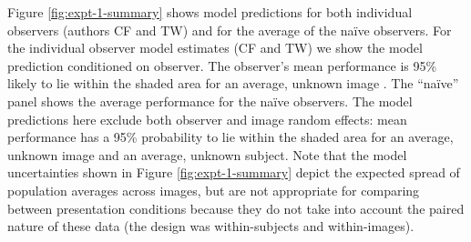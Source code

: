 \documentclass[doc, 11pt,a4paper,natbib]{apa6}\usepackage[]{graphicx}\usepackage[]{color}
\begin{document}
Figure \ref{fig:expt-1-summary} shows model predictions for both individual observers (authors CF and TW) and for the average of the na\"{i}ve observers.
For the individual observer model estimates (CF and TW) we show the model prediction conditioned on observer. 
The observer's mean performance is 95\% likely to lie within the shaded area for an average, unknown image \citep{baayen_mixed-effects_2008}.
The ``na\"{i}ve'' panel shows the average performance for the na\"{i}ve observers.
The model predictions here exclude both observer and image random effects: mean performance has a 95\% probability to lie within the shaded area for an average, unknown image and an average, unknown subject.
Note that the model uncertainties shown in Figure \ref{fig:expt-1-summary} depict the expected spread of population averages across images, but are not appropriate for comparing between presentation conditions because they do not take into account the paired nature of these data (the design was within-subjects and within-images).
\end{document}
